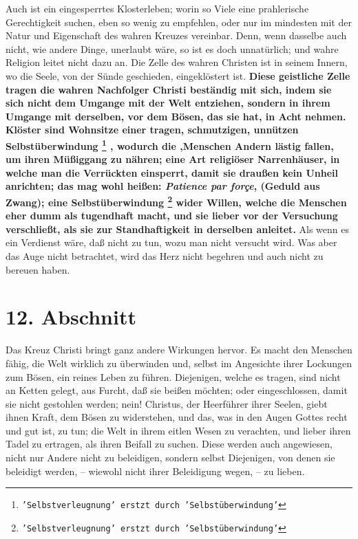 Auch ist ein eingesperrtes Klosterleben; worin so Viele eine
prahlerische
Gerechtigkeit suchen, eben so wenig zu empfehlen, oder nur im mindesten mit der
Natur und Eigenschaft des wahren Kreuzes vereinbar. Denn, wenn dasselbe auch
nicht, wie andere Dinge, unerlaubt wäre, so ist es doch unnatürlich; und wahre
Religion leitet nicht dazu an. Die Zelle des wahren Christen ist in seinem
Innern, wo die Seele, von der Sünde geschieden, eingeklöstert ist. \textbf{Diese
geistliche Zelle tragen die wahren Nachfolger Christi beständig mit sich, indem
sie sich nicht dem Umgange mit der Welt entziehen, sondern in ihrem Umgange mit
derselben, vor dem Bösen, das sie hat, in Acht nehmen. Klöster sind Wohnsitze
einer tragen, schmutzigen, unnützen Selbstüberwindung \footnote{\texttt{'Selbstverleugnung' erstzt durch 'Selbstüberwindung'}}
, wodurch die ,Menschen
Andern lästig fallen, um ihren Müßiggang  zu nähren; eine
Art religiöser Narrenhäuser, in welche man die Verrückten einsperrt, damit sie draußen kein
Unheil anrichten; das mag wohl heißen: \textit{Patience par forçe}, (Geduld aus
Zwang); eine Selbstüberwindung \footnote{\texttt{'Selbstverleugnung' erstzt durch 'Selbstüberwindung'}} wider  Willen, welche die Menschen eher dumm als
tugendhaft macht, und sie lieber vor der Versuchung verschließt, als sie zur
Standhaftigkeit in derselben anleitet.} Als wenn es ein Verdienst wäre, daß nicht
zu tun, wozu man nicht versucht wird. Was aber das Auge nicht betrachtet, wird
das Herz nicht begehren und auch nicht zu bereuen haben.

\section{12. Abschnitt} \label{kap5_ab12}

Das Kreuz Christi bringt ganz andere Wirkungen hervor. Es macht den Menschen
fähig, die Welt wirklich zu überwinden und, selbst im Angesichte ihrer Lockungen
zum Bösen, ein reines Leben zu führen. Diejenigen, welche es tragen, sind nicht
an Ketten gelegt, aus Furcht, daß sie beißen möchten; oder eingeschlossen, damit
sie nicht gestohlen werden; nein! Christus, der Heerführer ihrer Seelen, giebt
ihnen Kraft, dem Bösen zu widerstehen, und das, was in den Augen Gottes recht
und gut ist, zu tun; die Welt in ihrem eitlen Wesen zu verachten, und lieber
ihren Tadel zu ertragen, als ihren Beifall zu suchen.  Diese werden auch
angewiesen, nicht nur Andere nicht zu beleidigen, sondern selbst Diejenigen, von
denen sie beleidigt werden, -- wiewohl nicht ihrer Beleidigung wegen, -- zu
lieben.

